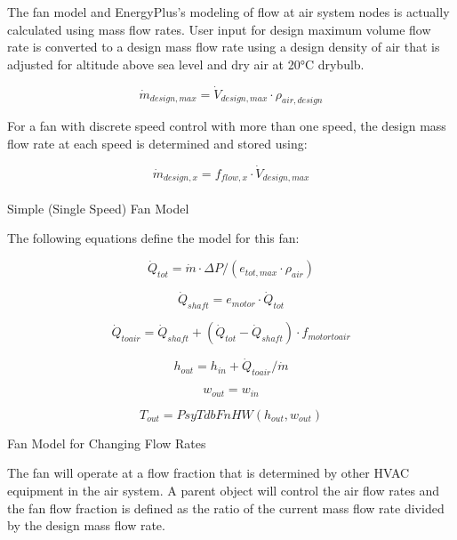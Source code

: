 The fan model and EnergyPlus's modeling of flow at air system nodes is actually calculated using mass flow rates.  User input for design maximum volume flow rate is converted to a design mass flow rate using a design density of air that is adjusted for altitude above sea level and dry air at 20°C drybulb.

\begin{equation}
{\dot m_{design,max}} = {\dot V_{design, max}} \cdot  {\rho_{air,design}}
\end{equation}

For a fan with discrete speed control with more than one speed, the design mass flow rate at each speed is determined and stored using:

\begin{equation}
{\dot m_{design,x}} = {f_{flow,x}} \cdot {\dot V_{design,max}}
\end{equation}
\\
Simple (Single Speed) Fan Model

The following equations define the model for this fan:

\begin{equation}
{\dot Q_{tot}} = \dot m\cdot \Delta P/({e_{tot,max}}\cdot {\rho_{air}})
\end{equation}

\begin{equation}
{\dot Q_{shaft}} = {e_{motor}}\cdot {\dot Q_{tot}}
\end{equation}

\begin{equation}
{\dot Q_{toair}} = {\dot Q_{shaft}} + ({\dot Q_{tot}} - {\dot Q_{shaft}})\cdot {f_{motortoair}}
\end{equation}

\begin{equation}
{h_{out}} = {h_{in}} + {\dot Q_{toair}}/\dot m
\end{equation}

\begin{equation}
{w_{out}} = {w_{in}}
\end{equation}

\begin{equation}
{T_{out}} = PsyTdbFnHW({h_{out}},{w_{out}})
\end{equation}

Fan Model for Changing Flow Rates

The fan will operate at a flow fraction that is determined by other HVAC equipment in the air system.  A parent object will control the air flow rates and the fan flow fraction is defined as the ratio of the current mass flow rate divided by the design mass flow rate.

